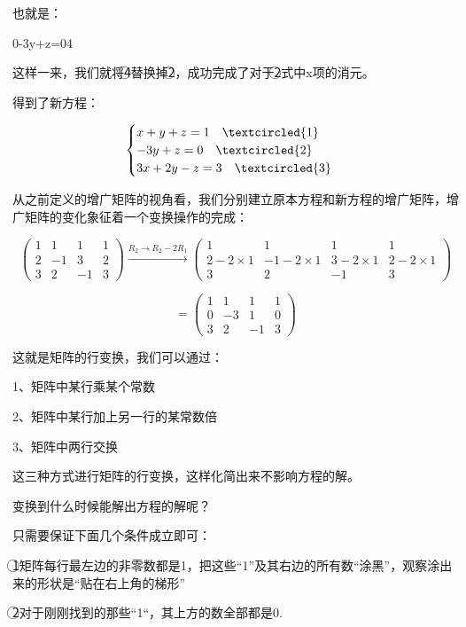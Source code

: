 \documentclass[12.8pt,a4paper,numbering = AMSalpha]{book}
\begin{document}
也就是：
\begin{center}
	0-3y+z=0\textcircled{4}
\end{center}

这样一来，我们就将\textcircled{4}替换掉\textcircled{2}，成功完成了对于\textcircled{2}式中x项的消元。

得到了新方程：

\[
\begin{cases}
	x + y + z = 1    \quad\textcircled{1}\\
	- 3y + z = 0  \quad\textcircled{2}\\
	3x + 2y - z = 3  \quad\textcircled{3}
\end{cases}
\]

从之前定义的增广矩阵的视角看，我们分别建立原本方程和新方程的增广矩阵，增广矩阵的变化象征着一个变换操作的完成：

\[
\begin{pmatrix}
	1 & 1 & 1 & 1\\
	2 & -1 & 3 & 2\\
	3 & 2 & -1 & 3
\end{pmatrix}
\xrightarrow{R_2\rightarrow R_2 - 2R_1}\begin{pmatrix}
	1 & 1 & 1 & 1\\
	2 - 2\times1 & -1 - 2\times1 & 3 - 2\times1 & 2 - 2\times1\\
	3 & 2 & -1 & 3
\end{pmatrix}
\]

\[
=
\begin{pmatrix}
	1 & 1 & 1 & 1\\
	0 & -3 & 1 & 0\\
	3 & 2 & -1 & 3
\end{pmatrix}
\]

这就是矩阵的行变换，我们可以通过：

1、矩阵中某行乘某个常数

2、矩阵中某行加上另一行的某常数倍

3、矩阵中两行交换

这三种方式进行矩阵的行变换，这样化简出来不影响方程的解。

\vspace{10pt}
变换到什么时候能解出方程的解呢？

只需要保证下面几个条件成立即可：

\textcircled{1}矩阵每行最左边的非零数都是1，把这些“1”及其右边的所有数“涂黑”，观察涂出来的形状是“贴在右上角的梯形”

\textcircled{2}对于刚刚找到的那些“1“，其上方的数全部都是0.
\end{document}
